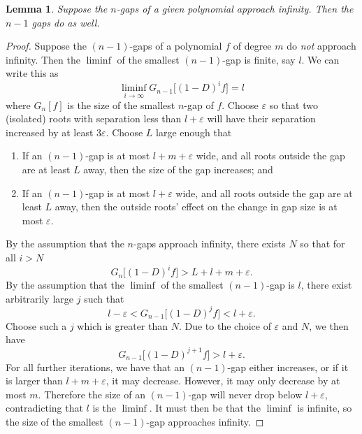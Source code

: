 \documentclass[11pt]{article}
\newtheorem{lemma}[theorem]{Lemma}
\newcommand{\e}{\varepsilon}
\begin{document}
\begin{lemma}
\label{lem:gapinduction}
	Suppose the $n$-gaps of a given polynomial approach infinity. Then the $n-1$ gaps do as well.
\end{lemma}
\begin{proof}
	Suppose the $(n-1)$-gaps of a polynomial $f$ of degree $m$ do \emph{not} approach infinity. Then the $\liminf$ of the smallest $(n-1)$-gap is finite, say $l$. We can write this as
		\[ \liminf_{i\to\infty} G_{n-1}\big[(1-D)^i f\big] = l \]
	where $G_n[f]$ is the size of the smallest $n$-gap of $f$. Choose $\e$ so that two (isolated) roots with separation less than $l+\e$ will have their separation increased by at least $3\e$. Choose $L$ large enough that
	\begin{enumerate}
		\item If an $(n-1)$-gap is at most $l+m+\e$ wide, and all roots outside the gap are at least $L$ away, then the size of the gap increases; and
		\item If an $(n-1)$-gap is at most $l+\e$ wide, and all roots outside the gap are at least $L$ away, then the outside roots' effect on the change in gap size is at most $\e$.
	\end{enumerate}
	By the assumption that the $n$-gaps approach infinity, there exists $N$ so that for all $i>N$
		\[ G_n\big[(1-D)^i f\big] > L + l + m + \e. \]
	By the assumption that the $\liminf$ of the smallest $(n-1)$-gap is $l$, there exist arbitrarily large $j$ such that
		\[ l-\e < G_{n-1}\big[ (1-D)^j f\big] < l+\e. \]
	Choose such a $j$ which is greater than $N$. Due to the choice of $\e$ and $N$, we then have
		\[ G_{n-1}\big[ (1-D)^{j+1} f\big] > l+\e. \]
	For all further iterations, we have that an $(n-1)$-gap either increases, or if it is larger than $l+m+\e$, it may decrease. However, it may only decrease by at most $m$. Therefore the size of an $(n-1)$-gap will never drop below $l+\e$, contradicting that $l$ is the $\liminf$. It must then be that the $\liminf$ is infinite, so the size of the smallest $(n-1)$-gap approaches infinity.
\end{proof}
\end{document}
